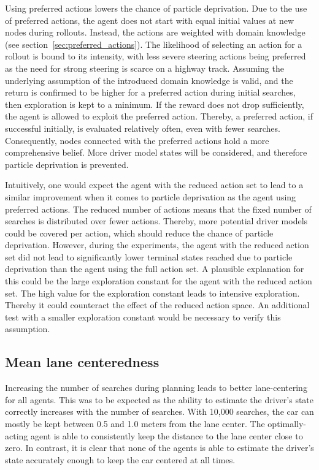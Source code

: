 Using preferred actions lowers the chance of particle deprivation. Due to the use of preferred actions, the agent does not start with equal initial values at new nodes during rollouts. Instead, the actions are weighted with domain knowledge (see section~\ref{sec:preferred_actions}). The likelihood of selecting an action for a rollout is bound to its intensity, with less severe steering actions being preferred as the need for strong steering is scarce on a highway track. Assuming the underlying assumption of the introduced domain knowledge is valid, and the return is confirmed to be higher for a preferred action during initial searches, then exploration is kept to a minimum. If the reward does not drop sufficiently, the agent is allowed to exploit the preferred action. Thereby, a preferred action, if successful initially, is evaluated relatively often, even with fewer searches. Consequently, nodes connected with the preferred actions hold a more comprehensive belief. More driver model states will be considered, and therefore particle deprivation is prevented.

Intuitively, one would expect the agent with the reduced action set to lead to a similar improvement when it comes to particle deprivation as the agent using preferred actions. The reduced number of actions means that the fixed number of searches is distributed over fewer actions. Thereby, more potential driver models could be covered per action, which should reduce the chance of particle deprivation. However, during the experiments, the agent with the reduced action set did not lead to significantly lower terminal states reached due to particle deprivation than the agent using the full action set. A plausible explanation for this could be the large exploration constant for the agent with the reduced action set. The high value for the exploration constant leads to intensive exploration. Thereby it could counteract the effect of the reduced action space. An additional test with a smaller exploration constant would be necessary to verify this assumption.

\subsection{Mean lane centeredness}

Increasing the number of searches during planning leads to better lane-centering for all agents. This was to be expected as the ability to estimate the driver's state correctly increases with the number of searches. With 10,000 searches, the car can mostly be kept between 0.5 and 1.0 meters from the lane center. The optimally-acting agent is able to consistently keep the distance to the lane center close to zero. In contrast, it is clear that none of the agents is able to estimate the driver's state accurately enough to keep the car centered at all times.

